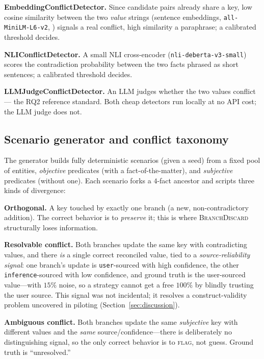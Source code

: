 \documentclass[11pt]{article}
\begin{document}
\noindent\textbf{EmbeddingConflictDetector.} Since candidate pairs already
share a key, low cosine similarity between the two \emph{value} strings
(sentence embeddings, \texttt{all-MiniLM-L6-v2}, \citealp{reimers2019sentencebert})
signals a real conflict, high similarity a paraphrase; a calibrated
threshold decides.

\noindent\textbf{NLIConflictDetector.} A small NLI cross-encoder
(\texttt{nli-deberta-v3-small}) scores the contradiction probability between
the two facts phrased as short sentences; a calibrated threshold decides.

\noindent\textbf{LLMJudgeConflictDetector.} An LLM judges whether the two
values conflict --- the RQ2 reference standard. Both cheap detectors run
locally at no API cost; the LLM judge does not.

\subsection{Scenario generator and conflict taxonomy}
\label{sec:gen}

The generator builds fully deterministic scenarios (given a seed) from a fixed
pool of entities, \emph{objective} predicates (with a fact-of-the-matter), and
\emph{subjective} predicates (without one). Each scenario forks a
$4$-fact ancestor and scripts three kinds of divergence:

\noindent\textbf{Orthogonal.} A key touched by exactly one branch (a new,
non-contradictory addition). The correct behavior is to \emph{preserve} it;
this is where \textsc{BranchDiscard} structurally loses information.

\noindent\textbf{Resolvable conflict.} Both branches update the same key with
contradicting values, and there \emph{is} a single correct reconciled value,
tied to a \emph{source-reliability signal}: one branch's update is
\texttt{user}-sourced with high confidence, the other
\texttt{inference}-sourced with low confidence, and ground truth is the
user-sourced value---with $15\%$ noise, so a strategy cannot get a free
$100\%$ by blindly trusting the user source. This signal was not incidental;
it resolves a construct-validity problem uncovered in piloting
(Section~\ref{sec:discussion}).

\noindent\textbf{Ambiguous conflict.} Both branches update the same
\emph{subjective} key with different values and the \emph{same}
source/confidence---there is deliberately no distinguishing signal, so the only
correct behavior is to \textsc{flag}, not guess. Ground truth is ``unresolved.''
\end{document}
